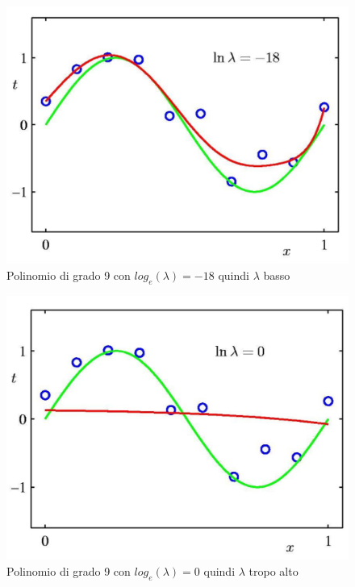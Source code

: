 \documentclass{article}
\begin{document}
\begin{figure}[H]
\centering
\includegraphics[scale=0.3]{Images/9gradopollambda.png}
\caption{Polinomio di grado 9 con $log_e(\lambda) = -18$ quindi $\lambda$ basso}
\end{figure}

\begin{figure}[H]
\centering
\includegraphics[scale=0.3]{Images/9gradopollambda0.png}
\caption{Polinomio di grado 9 con $log_e(\lambda) = 0$ quindi $\lambda$ tropo alto}
\end{figure}
\end{document}
